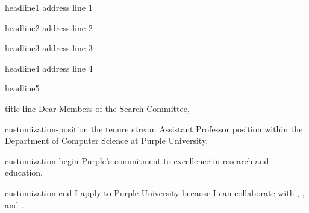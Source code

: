 headline1%
address line 1

headline2%
address line 2


headline3%
address line 3

headline4%
address line 4

headline5%
\vspace{-4pt}


title-line%
Dear Members of the Search Committee,

customization-position%
the tenure stream Assistant Professor position within the Department of Computer Science at Purple University.

customization-begin%
Purple's commitment to excellence in research and education.

customization-end%
I apply to Purple University because I can collaborate with , , and .


